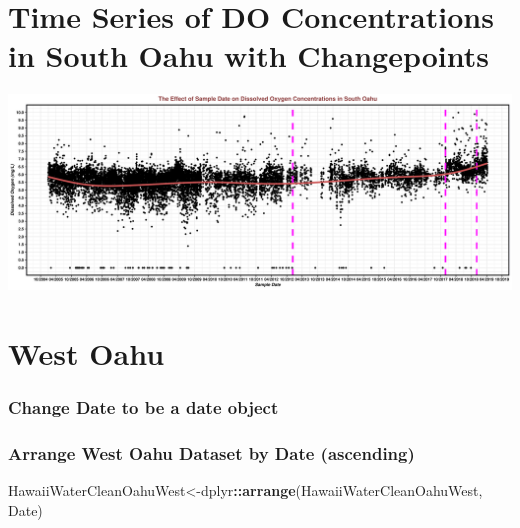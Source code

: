 \documentclass[12pt,]{article}
\newenvironment{Shaded}{\begin{snugshade}}{\end{snugshade}}
\newcommand{\KeywordTok}[1]{\textcolor[rgb]{0.13,0.29,0.53}{\textbf{#1}}}
\newcommand{\DataTypeTok}[1]{\textcolor[rgb]{0.13,0.29,0.53}{#1}}
\newcommand{\StringTok}[1]{\textcolor[rgb]{0.31,0.60,0.02}{#1}}
\newcommand{\OperatorTok}[1]{\textcolor[rgb]{0.81,0.36,0.00}{\textbf{#1}}}
\newcommand{\NormalTok}[1]{#1}
\begin{document}
\section{Time Series of DO Concentrations in South Oahu with
Changepoints}\label{time-series-of-do-concentrations-in-south-oahu-with-changepoints}

\includegraphics{Garcia_ENV872_Project_files/figure-latex/South Oahu-1.pdf}

\section{West Oahu}\label{west-oahu}

\subsubsection{Change Date to be a date
object}\label{change-date-to-be-a-date-object-2}

\begin{Shaded}
\end{Shaded}

\subsubsection{Arrange West Oahu Dataset by Date
(ascending)}\label{arrange-west-oahu-dataset-by-date-ascending}

\begin{Shaded}
\begin{Highlighting}[]
\NormalTok{HawaiiWaterCleanOahuWest<-dplyr}\OperatorTok{::}\KeywordTok{arrange}\NormalTok{(HawaiiWaterCleanOahuWest, Date)}
\end{Highlighting}
\end{Shaded}
\end{document}
